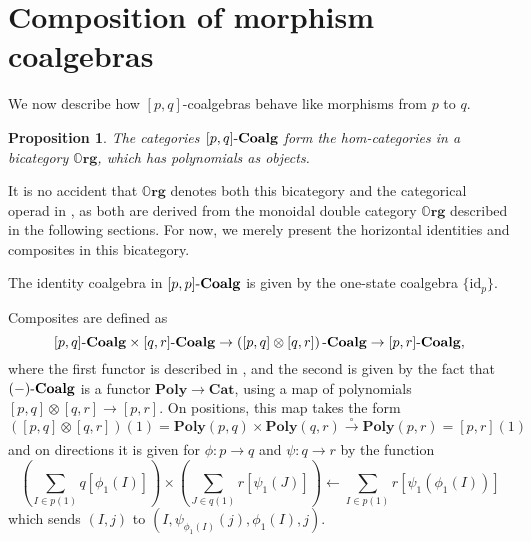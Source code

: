 \documentclass[11pt, one side, article]{memoir}
\theoremstyle{definition}
\theoremstyle{plain}
\newtheorem{proposition}[definitionx]{Proposition}
\newcommand{\Cat}[1]{\mathbf{#1}}%
\newcommand{\id}{\mathrm{id}}
\newcommand{\To}[2][]{\xrightarrow[#1]{#2}}
\newcommand{\from}{\leftarrow}
\newcommand{\tn}[1]{\textnormal{#1}}
\newcommand{\smcat}{\Cat{Cat}}
\newcommand{\poly}{\Cat{Poly}}
\newcommand{\0}{\textsf{0}}
\newcommand{\1}{\tn{\textsf{1}}}
\newcommand{\coalg}{\tn{-}\Cat{Coalg}}
\newcommand{\org}{{\mathbb{O}\Cat{rg}}}
\newcommand{\idcoalg}[1]{{\{\id_{#1}\}}}
\newcommand{\dnote}[1]{{\color{blue}David says:}~#1.\quad{\color{blue}$\lozenge$}}
\begin{document}
\section{Composition of morphism coalgebras}



We now describe how $[p,q]$-coalgebras behave like morphisms from $p$ to $q$.

\begin{proposition}
The categories $[p,q]\coalg$ form the hom-categories in a bicategory $\org$, which has polynomials as objects.
\end{proposition}

It is no accident that $\org$ denotes both this bicategory and the categorical operad in \cite[Definition 2.19]{spivak2021learners}, as both are derived from the monoidal double category $\org$ described in the following sections. For now, we merely present the horizontal identities and composites in this bicategory.

The identity coalgebra in $[p,p]\coalg$ is given by the one-state coalgebra $\idcoalg{p}$. 

Composites are defined as
$$[p,q]\coalg \times [q,r]\coalg \to \left([p,q] \otimes [q,r]\right)\coalg \to [p,r]\coalg,$$
where the first functor is described in \cite[Proposition 2.13]{spivak2021learners}, and the second is given by the fact that $(-)\coalg$ is a functor $\poly \to \smcat$, using a map of polynomials $[p,q] \otimes [q,r] \to [p,r]$. On positions, this map takes the form
$$\left([p,q] \otimes [q,r]\right)(1) = \poly(p,q) \times \poly(q,r) \To{\circ} \poly(p,r) = [p,r](1)$$
and on directions it is given for $\phi : p \to q$ and $\psi : q \to r$ by the function
$$\left(\sum_{I \in p(1)} q[\phi_1(I)]\right) \times \left(\sum_{J \in q(1)} r[\psi_1(J)]\right) \from \sum_{I \in p(1)} r[\psi_1(\phi_1(I))]$$
which sends $(I,j)$ to $(I,\psi_{\phi_1(I)}(j),\phi_1(I),j)$. 
\end{document}
